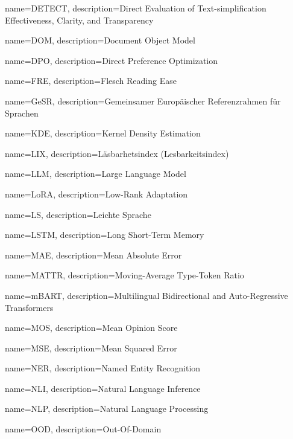 {
    name={DETECT},
    description={Direct Evaluation of Text-simplification Effectiveness, Clarity, and Transparency}
}

{
    name={DOM},
    description={Document Object Model}
}

{
    name={DPO},
    description={Direct Preference Optimization}
}

{
    name={FRE},
    description={Flesch Reading Ease}
}

{
    name={GeSR},
    description={Gemeinsamer Europäischer Referenzrahmen für Sprachen}
}

{
    name={KDE},
    description={Kernel Density Estimation}
}

{
    name={LIX},
    description={Läsbarhetsindex (Lesbarkeitsindex)}
}

{
    name={LLM},
    description={Large Language Model}
}

{
    name={LoRA},
    description={Low-Rank Adaptation}
}

{
    name={LS},
    description={Leichte Sprache}
}

{
    name={LSTM},
    description={Long Short-Term Memory}
}

{
    name={MAE},
    description={Mean Absolute Error}
}

{
    name={MATTR},
    description={Moving-Average Type-Token Ratio}
}

{
    name={mBART},
    description={Multilingual Bidirectional and Auto-Regressive Transformers}
}

{
    name={MOS},
    description={Mean Opinion Score}
}

{
    name={MSE},
    description={Mean Squared Error}
}

{
    name={NER},
    description={Named Entity Recognition}
}

{
    name={NLI},
    description={Natural Language Inference}
}

{
    name={NLP},
    description={Natural Language Processing}
}

{
    name={OOD},
    description={Out-Of-Domain}
}

